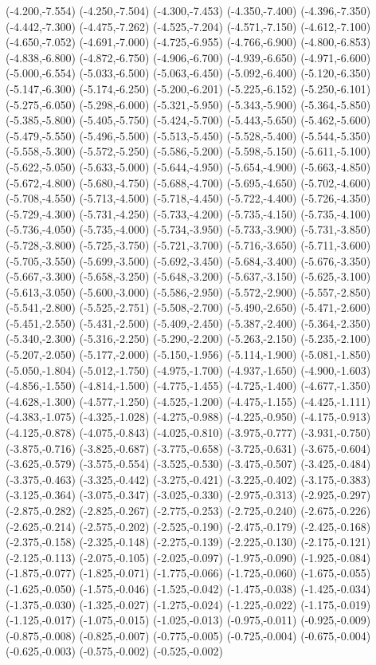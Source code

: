 (-4.200,-7.554) (-4.250,-7.504) (-4.300,-7.453) (-4.350,-7.400) (-4.396,-7.350) (-4.442,-7.300) (-4.475,-7.262) (-4.525,-7.204) (-4.571,-7.150) (-4.612,-7.100) (-4.650,-7.052) (-4.691,-7.000) (-4.725,-6.955) (-4.766,-6.900) (-4.800,-6.853) (-4.838,-6.800) (-4.872,-6.750) (-4.906,-6.700) (-4.939,-6.650) (-4.971,-6.600) (-5.000,-6.554) (-5.033,-6.500) (-5.063,-6.450) (-5.092,-6.400) (-5.120,-6.350) (-5.147,-6.300) (-5.174,-6.250) (-5.200,-6.201) (-5.225,-6.152) (-5.250,-6.101) (-5.275,-6.050) (-5.298,-6.000) (-5.321,-5.950) (-5.343,-5.900) (-5.364,-5.850) (-5.385,-5.800) (-5.405,-5.750) (-5.424,-5.700) (-5.443,-5.650) (-5.462,-5.600) (-5.479,-5.550) (-5.496,-5.500) (-5.513,-5.450) (-5.528,-5.400) (-5.544,-5.350) (-5.558,-5.300) (-5.572,-5.250) (-5.586,-5.200) (-5.598,-5.150) (-5.611,-5.100) (-5.622,-5.050) (-5.633,-5.000) (-5.644,-4.950) (-5.654,-4.900) (-5.663,-4.850) (-5.672,-4.800) (-5.680,-4.750) (-5.688,-4.700) (-5.695,-4.650) (-5.702,-4.600) (-5.708,-4.550) (-5.713,-4.500) (-5.718,-4.450) (-5.722,-4.400) (-5.726,-4.350) (-5.729,-4.300) (-5.731,-4.250) (-5.733,-4.200) (-5.735,-4.150) (-5.735,-4.100) (-5.736,-4.050) (-5.735,-4.000) (-5.734,-3.950) (-5.733,-3.900) (-5.731,-3.850) (-5.728,-3.800) (-5.725,-3.750) (-5.721,-3.700) (-5.716,-3.650) (-5.711,-3.600) (-5.705,-3.550) (-5.699,-3.500) (-5.692,-3.450) (-5.684,-3.400) (-5.676,-3.350) (-5.667,-3.300) (-5.658,-3.250) (-5.648,-3.200) (-5.637,-3.150) (-5.625,-3.100) (-5.613,-3.050) (-5.600,-3.000) (-5.586,-2.950) (-5.572,-2.900) (-5.557,-2.850) (-5.541,-2.800) (-5.525,-2.751) (-5.508,-2.700) (-5.490,-2.650) (-5.471,-2.600) (-5.451,-2.550) (-5.431,-2.500) (-5.409,-2.450) (-5.387,-2.400) (-5.364,-2.350) (-5.340,-2.300) (-5.316,-2.250) (-5.290,-2.200) (-5.263,-2.150) (-5.235,-2.100) (-5.207,-2.050) (-5.177,-2.000) (-5.150,-1.956) (-5.114,-1.900) (-5.081,-1.850) (-5.050,-1.804) (-5.012,-1.750) (-4.975,-1.700) (-4.937,-1.650) (-4.900,-1.603) (-4.856,-1.550) (-4.814,-1.500) (-4.775,-1.455) (-4.725,-1.400) (-4.677,-1.350) (-4.628,-1.300) (-4.577,-1.250) (-4.525,-1.200) (-4.475,-1.155) (-4.425,-1.111) (-4.383,-1.075) (-4.325,-1.028) (-4.275,-0.988) (-4.225,-0.950) (-4.175,-0.913) (-4.125,-0.878) (-4.075,-0.843) (-4.025,-0.810) (-3.975,-0.777) (-3.931,-0.750) (-3.875,-0.716) (-3.825,-0.687) (-3.775,-0.658) (-3.725,-0.631) (-3.675,-0.604) (-3.625,-0.579) (-3.575,-0.554) (-3.525,-0.530) (-3.475,-0.507) (-3.425,-0.484) (-3.375,-0.463) (-3.325,-0.442) (-3.275,-0.421) (-3.225,-0.402) (-3.175,-0.383) (-3.125,-0.364) (-3.075,-0.347) (-3.025,-0.330) (-2.975,-0.313) (-2.925,-0.297) (-2.875,-0.282) (-2.825,-0.267) (-2.775,-0.253) (-2.725,-0.240) (-2.675,-0.226) (-2.625,-0.214) (-2.575,-0.202) (-2.525,-0.190) (-2.475,-0.179) (-2.425,-0.168) (-2.375,-0.158) (-2.325,-0.148) (-2.275,-0.139) (-2.225,-0.130) (-2.175,-0.121) (-2.125,-0.113) (-2.075,-0.105) (-2.025,-0.097) (-1.975,-0.090) (-1.925,-0.084) (-1.875,-0.077) (-1.825,-0.071) (-1.775,-0.066) (-1.725,-0.060) (-1.675,-0.055) (-1.625,-0.050) (-1.575,-0.046) (-1.525,-0.042) (-1.475,-0.038) (-1.425,-0.034) (-1.375,-0.030) (-1.325,-0.027) (-1.275,-0.024) (-1.225,-0.022) (-1.175,-0.019) (-1.125,-0.017) (-1.075,-0.015) (-1.025,-0.013) (-0.975,-0.011) (-0.925,-0.009) (-0.875,-0.008) (-0.825,-0.007) (-0.775,-0.005) (-0.725,-0.004) (-0.675,-0.004) (-0.625,-0.003) (-0.575,-0.002) (-0.525,-0.002) 
